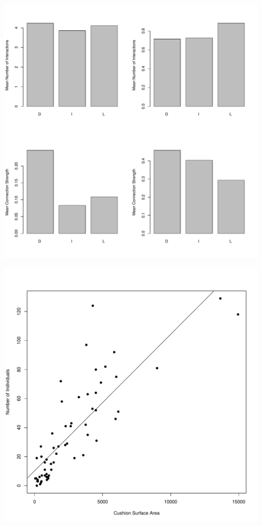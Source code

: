 \documentclass[12pt]{article}
\begin{document}
\includegraphics{O_cornuta_ms-010}

\includegraphics{O_cornuta_ms-011}
\end{document}
